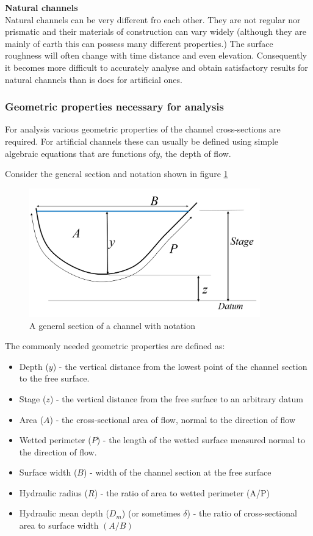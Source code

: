 \documentclass[a4paper, 12pt, british]{article} %
\numberwithin{equation}{section}
\numberwithin{figure}{section}
\numberwithin{table}{section}
\begin{document}
\textbf{Natural channels}\\
Natural channels can be very different fro each other. They are not regular nor prismatic and their materials of construction can vary widely (although they are mainly of earth this can possess many different properties.) The surface roughness will often change with time distance and even elevation. Consequently it becomes more difficult to accurately analyse and obtain satisfactory results for natural channels than is does for artificial ones. 

\subsubsection{Geometric properties necessary for analysis}
For analysis various geometric properties of the channel cross-sections are required. For artificial channels these can usually be defined using simple algebraic equations that are functions of$y$, the depth of flow. 

Consider the general section and notation shown in figure \ref{fig:section_general_0}
\begin{figure}[H]
	\centering
	\includegraphics[width=10cm]{./images/section_general.png}
	\caption{A general section of a channel with notation}
	\label{fig:section_general_0}
\end{figure}

The commonly needed geometric properties are defined as:
\begin{itemize}
	\item Depth ($y$) - the vertical distance from the lowest point of the channel section to the free surface.
\item Stage ($z$) - the vertical distance from the free surface to an arbitrary datum
\item Area ($A$) - the cross-sectional area of flow, normal to the direction of flow
\item Wetted perimeter ($P$) - the length of the wetted surface measured normal to the direction of flow.
\item Surface width ($B$) - width of the channel section at the free surface
\item Hydraulic radius ($R$) - the ratio of area to wetted perimeter (A/P)
\item Hydraulic mean depth ($D_m$) (or sometimes $\delta$) - the ratio of cross-sectional area to surface width $(A/B)$
\end{itemize}
\end{document}
